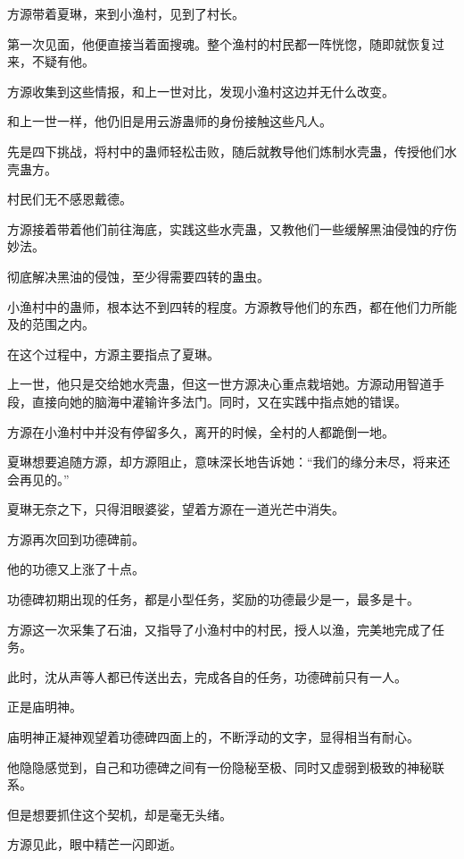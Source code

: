 
\begin{this_body}

方源带着夏琳，来到小渔村，见到了村长。

第一次见面，他便直接当着面搜魂。整个渔村的村民都一阵恍惚，随即就恢复过来，不疑有他。

方源收集到这些情报，和上一世对比，发现小渔村这边并无什么改变。

和上一世一样，他仍旧是用云游蛊师的身份接触这些凡人。

先是四下挑战，将村中的蛊师轻松击败，随后就教导他们炼制水壳蛊，传授他们水壳蛊方。

村民们无不感恩戴德。

方源接着带着他们前往海底，实践这些水壳蛊，又教他们一些缓解黑油侵蚀的疗伤妙法。

彻底解决黑油的侵蚀，至少得需要四转的蛊虫。

小渔村中的蛊师，根本达不到四转的程度。方源教导他们的东西，都在他们力所能及的范围之内。

在这个过程中，方源主要指点了夏琳。

上一世，他只是交给她水壳蛊，但这一世方源决心重点栽培她。方源动用智道手段，直接向她的脑海中灌输许多法门。同时，又在实践中指点她的错误。

方源在小渔村中并没有停留多久，离开的时候，全村的人都跪倒一地。

夏琳想要追随方源，却方源阻止，意味深长地告诉她：“我们的缘分未尽，将来还会再见的。”

夏琳无奈之下，只得泪眼婆娑，望着方源在一道光芒中消失。

方源再次回到功德碑前。

他的功德又上涨了十点。

功德碑初期出现的任务，都是小型任务，奖励的功德最少是一，最多是十。

方源这一次采集了石油，又指导了小渔村中的村民，授人以渔，完美地完成了任务。

此时，沈从声等人都已传送出去，完成各自的任务，功德碑前只有一人。

正是庙明神。

庙明神正凝神观望着功德碑四面上的，不断浮动的文字，显得相当有耐心。

他隐隐感觉到，自己和功德碑之间有一份隐秘至极、同时又虚弱到极致的神秘联系。

但是想要抓住这个契机，却是毫无头绪。

方源见此，眼中精芒一闪即逝。


\end{this_body}
